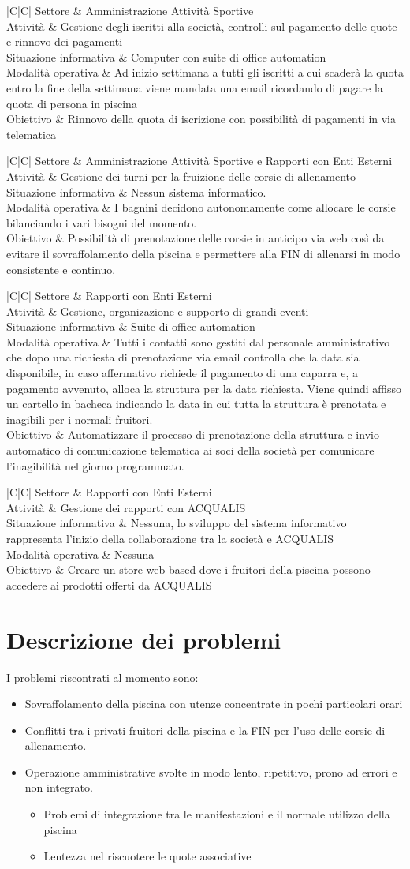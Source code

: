 \documentclass[11pt]{article} %
\newcommand{\AnalisiSituazioneAttualeTabella}[5]{
	\begin{tabulary}{\textwidth}{|C|C|}
		\hline
		Settore & #1 \\ \hline
		Attività & #2 \\ \hline
		Situazione informativa & #3 \\ \hline
		Modalità operativa & #4 \\ \hline
		Obiettivo & #5 \\
		\hline
	\end{tabulary}
}
\begin{document}
\AnalisiSituazioneAttualeTabella
	{Amministrazione Attività Sportive}
	{Gestione degli iscritti alla società, controlli sul pagamento delle quote e rinnovo dei pagamenti}
	{Computer con suite di office automation}
	{Ad inizio settimana a tutti gli iscritti a cui scaderà la quota entro la fine della settimana viene mandata una email ricordando di pagare la quota di persona in piscina}
	{Rinnovo della quota di iscrizione con possibilità di pagamenti in via telematica}

\AnalisiSituazioneAttualeTabella
	{Amministrazione Attività Sportive e Rapporti con Enti Esterni}
	{Gestione dei turni per la fruizione delle corsie di allenamento}
	{Nessun sistema informatico.}
	{I bagnini decidono autonomamente come allocare le corsie bilanciando i vari bisogni del momento.}
	{Possibilità di prenotazione delle corsie in anticipo via web così da evitare il sovraffolamento della piscina e permettere alla FIN di allenarsi in modo consistente e continuo.}

\AnalisiSituazioneAttualeTabella
	{Rapporti con Enti Esterni}
	{Gestione, organizazione e supporto di grandi eventi}
	{Suite di office automation}
	{Tutti i contatti sono gestiti dal personale amministrativo che dopo una richiesta di prenotazione via email controlla che la data sia disponibile, in caso affermativo richiede il pagamento di una caparra e, a pagamento avvenuto, alloca la struttura per la data richiesta. Viene quindi affisso un cartello in bacheca indicando la data in cui tutta la struttura è prenotata e inagibili per i normali fruitori.}
	{Automatizzare il processo di prenotazione della struttura e invio automatico di comunicazione telematica ai soci della società per comunicare l'inagibilità nel giorno programmato.}

\AnalisiSituazioneAttualeTabella
	{Rapporti con Enti Esterni}
	{Gestione dei rapporti con ACQUALIS}
	{Nessuna, lo sviluppo del sistema informativo rappresenta l'inizio della collaborazione tra la società e ACQUALIS}
	{Nessuna}
	{Creare un store web-based dove i fruitori della piscina possono accedere ai prodotti offerti da ACQUALIS}

\section{Descrizione dei problemi}

I problemi riscontrati al momento sono:

\begin{itemize}
	\item Sovraffolamento della piscina con utenze concentrate in pochi particolari orari
	\item Conflitti tra i privati fruitori della piscina e la FIN per l'uso delle corsie di allenamento.
	\item Operazione amministrative svolte in modo lento, ripetitivo, prono ad errori e non integrato.
	\begin{itemize}
		\item Problemi di integrazione tra le manifestazioni e il normale utilizzo della piscina
		\item Lentezza nel riscuotere le quote associative
	\end{itemize}
\end{itemize}
\end{document}
